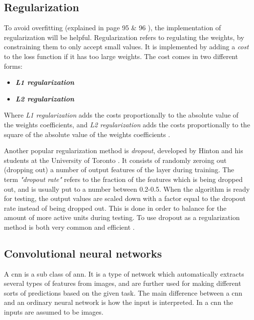 \documentclass[USenglish]{ifimaster}  %
\begin{document}
\subsection{Regularization}
To avoid overfitting (explained in page 95 \& 96 \cite{Francois_Deep_learning_with_python}), the implementation of regularization will be helpful. Regularization refers to regulating the weights, by constraining them to only accept small values. It is implemented by adding a \textit{cost} to the loss function if it has too large weights. The cost comes in two different forms:

\begin{itemize}
    \item \textit{\textbf{L1 regularization}}
    \item \textit{\textbf{L2 regularization}}
\end{itemize}
Where \textit{L1 regularization} adds the costs proportionally to the absolute value of the weights coefficients, and \textit{L2 regularization} adds the costs proportionally to the square of the absolute value of the weights coefficients \cite{Francois_Deep_learning_with_python}. 

Another popular regularization method is \textit{dropout}, developed by Hinton and his students at the University of Toronto \cite{website:dropout}. It consists of randomly zeroing out (dropping out) a number of output features of the layer during training. The term \textit{"dropout rate"} refers to the fraction of the features which is being dropped out, and is usually put to a number between 0.2-0.5. When the algorithm is ready for testing, the output values are scaled down with a factor equal to the dropout rate instead of being dropped out. This is done in order to balance for the amount of more active units during testing. To use dropout as a regularization method is both very common and efficient \cite{Francois_Deep_learning_with_python}.   

\subsection{Convolutional neural networks}\label{cnn}
A \ac{cnn} is a sub class of \ac{ann}. It is a type of network which automatically extracts several types of features from images, and are further used for making different sorts of predictions based on the given task. The main difference between a \ac{cnn} and an ordinary neural network is how the input is interpreted. In a \ac{cnn} the inputs are assumed to be images. 
\end{document}
